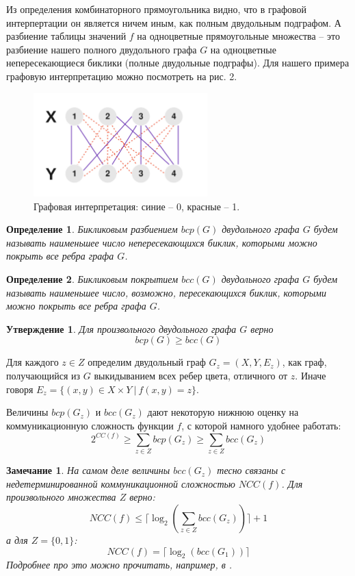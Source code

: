 \documentclass[a4paper]{article}
\newtheorem*{mclaim}{Утверждение}
\newtheorem*{mremark}{Замечание}
\newtheorem*{mdefinition}{Определение}
\begin{document}
Из определения комбинаторного прямоугольника видно, что в графовой интерпертации он является ничем
иным, как полным двудольным подграфом. А разбиение таблицы значений $f$ на одноцветные прямоугольные
множества -- это разбиение нашего  полного двудольного графа $G$ на одноцветные непересекающиеся биклики 
(полные двудольные подграфы). Для нашего примера графовую интерпретацию можно посмотреть на рис. 2.

\begin{figure}
	\centering
	\includegraphics[width=0.6\textwidth]{images/biclique.png}
	\caption{Графовая интерпретация: синие -- 0, красные -- 1.}
\end{figure}

\begin{mdefinition}
	Бикликовым разбиением $bcp(G)$ двудольного графа $G$ будем называть наименьшее число непересекающихся
	биклик, которыми можно покрыть все ребра графа $G$.
\end{mdefinition}


\begin{mdefinition}
	Бикликовым покрытием $bcc(G)$ двудольного графа $G$ будем называть наименьшее число, возможно, 
	пересекающихся биклик, которыми можно покрыть все ребра графа $G$.
\end{mdefinition}

\begin{mclaim}
    Для произвольного двудольного графа $G$ верно $$bcp(G) \geq bcc(G)$$
\end{mclaim}

Для каждого $z \in Z$ определим двудольный граф $G_z = (X, Y, E_z)$, как граф, получающийся из $G$ 
выкидыванием всех ребер цвета, отличного от $z$. Иначе говоря $E_z = \{(x,y)\in X\times Y\ |\ f(x, y) = z \}$.

Величины $bcp(G_z)$ и $bcc(G_z)$ дают некоторую нижнюю оценку на коммуникационную сложность функции $f$, 
с которой намного удобнее работать: $$2^{CC(f)}\geq \sum\limits_{z\in Z}bcp(G_z)\geq \sum\limits_{z\in Z}bcc(G_z)$$

\begin{mremark}
    На самом деле величины $bcc(G_z)$ тесно связаны с недетерминированной коммуникационной сложностью 
    $NCC(f)$. Для произвольного множества $Z$ верно: 
    $$NCC(f) \leq \lceil \log_2(\sum\limits_{z\in Z}bcc(G_z))\rceil + 1$$ а для 
    $Z = \{0, 1\}$: $$NCC(f) = \lceil \log_2(bcc(G_1))\rceil$$ 
    Подробнее про это можно прочитать, например, в \cite{Razborov}.
\end{mremark}
\end{document}
